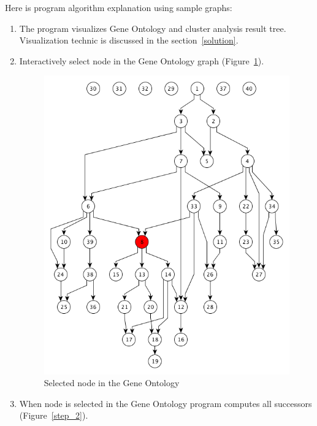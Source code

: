 \documentclass[a4paper,oneside]{article}
\begin{document}
Here is program algorithm explanation using sample graphs:
\begin{enumerate}
\item The program visualizes Gene Ontology and cluster analysis result tree. Visualization technic is discussed in the section~\ref{solution}.
\item Interactively select node in the Gene Ontology graph (Figure~\ref{step_1}).

\begin{figure}
	\begin{center}
		\includegraphics[scale=0.5]{pictures/subgraph_extraction_algorithm_step_1.png}
	\end{center}
	\caption{Selected node in the Gene Ontology}
	\label{step_1}
\end{figure}

\item When node is selected in the Gene Ontology program computes all successors (Figure~\ref{step_2}).


\end{enumerate}
\end{document}
